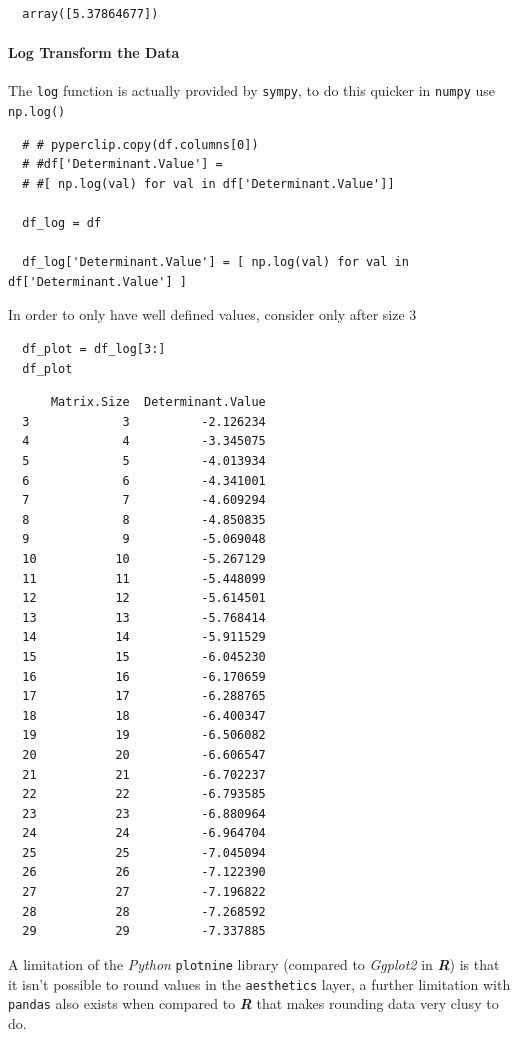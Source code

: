 \documentclass[11pt]{article}
\begin{document}
\begin{verbatim}
  array([5.37864677])
\end{verbatim}

\paragraph{Log Transform the Data}
\label{log-transform-the-data}
The \texttt{log} function is actually provided by \texttt{sympy}, to do this quicker
in \texttt{numpy} use \texttt{np.log()}

\begin{verbatim}
  # # pyperclip.copy(df.columns[0])
  # #df['Determinant.Value'] =
  # #[ np.log(val) for val in df['Determinant.Value']]

  df_log = df

  df_log['Determinant.Value'] = [ np.log(val) for val in df['Determinant.Value'] ]

\end{verbatim}

In order to only have well defined values, consider only after size 3

\begin{verbatim}
  df_plot = df_log[3:]
  df_plot
\end{verbatim}

\begin{verbatim}
      Matrix.Size  Determinant.Value
  3             3          -2.126234
  4             4          -3.345075
  5             5          -4.013934
  6             6          -4.341001
  7             7          -4.609294
  8             8          -4.850835
  9             9          -5.069048
  10           10          -5.267129
  11           11          -5.448099
  12           12          -5.614501
  13           13          -5.768414
  14           14          -5.911529
  15           15          -6.045230
  16           16          -6.170659
  17           17          -6.288765
  18           18          -6.400347
  19           19          -6.506082
  20           20          -6.606547
  21           21          -6.702237
  22           22          -6.793585
  23           23          -6.880964
  24           24          -6.964704
  25           25          -7.045094
  26           26          -7.122390
  27           27          -7.196822
  28           28          -7.268592
  29           29          -7.337885
\end{verbatim}

A limitation of the \emph{Python} \texttt{plotnine} library (compared to \emph{Ggplot2}
in \textbf{\emph{R}}) is that it isn't possible to round values in the \texttt{aesthetics}
layer, a further limitation with \texttt{pandas} also exists when compared to
\textbf{\emph{R}} that makes rounding data very clusy to do.
\end{document}
